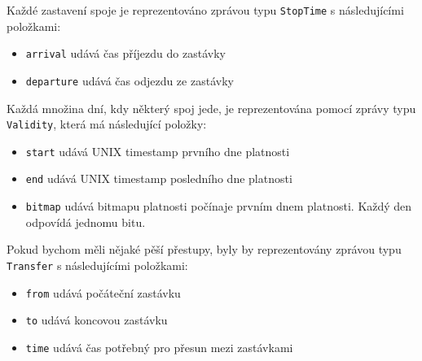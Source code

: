 Každé zastavení spoje je reprezentováno zprávou typu {\tt StopTime} s
následujícími položkami:
\begin{itemize}
	\item {\tt arrival} udává čas příjezdu do zastávky
	\item {\tt departure} udává čas odjezdu ze zastávky
\end{itemize}
Každá množina dní, kdy některý spoj jede, je reprezentována pomocí zprávy typu
{\tt Validity}, která má následující položky:
\begin{itemize}
	\item {\tt start} udává UNIX timestamp prvního dne platnosti 
	\item {\tt end} udává UNIX timestamp posledního dne platnosti
	\item {\tt bitmap} udává bitmapu platnosti počínaje prvním dnem
	platnosti. Každý den odpovídá jednomu bitu.
\end{itemize}
Pokud bychom měli nějaké pěší přestupy, byly by reprezentovány zprávou typu {\tt
Transfer} s následujícími položkami:
\begin{itemize}
	\item {\tt from} udává počáteční zastávku
	\item {\tt to} udává koncovou zastávku
	\item {\tt time} udává čas potřebný pro přesun mezi zastávkami
\end{itemize}

